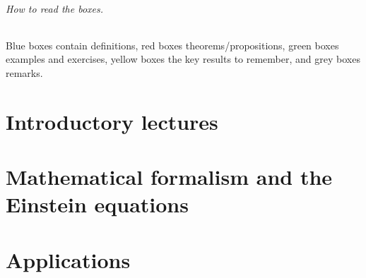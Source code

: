 \documentclass[11pt,a4paper]{report}
\begin{document}
\paragraph{How to read the boxes.}
Blue boxes contain definitions, red boxes theorems/propositions, green boxes examples and exercises,
yellow boxes the key results to remember, and grey boxes remarks.

\tableofcontents

\part{Introductory lectures}



\part{Mathematical formalism and the Einstein equations}







\part{Applications}





\appendix

\end{document}
